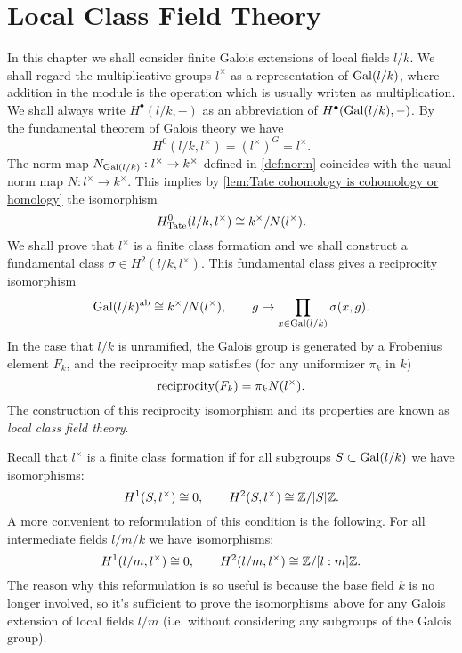 \chapter{Local Class Field Theory}

In this chapter we shall consider finite Galois extensions of local fields $l/k$.
We shall regard the multiplicative groups $l^\times$ as a representation of $\mathrm{Gal}(l/k)$, where
addition in the module is the operation which is usually written as multiplication.
We shall always write $H^\bullet(l/k,-)$ as an abbreviation of $H^\bullet(\mathrm{Gal}(l/k),-)$.
By the fundamental theorem of Galois theory we have
\[
	H^0(l/k,l^\times) = (l^\times)^G = l^\times.
\]
The norm map $N_{\mathrm{Gal}(l/k)} : l^\times \to k^\times$ defined in \ref{def:norm}
coincides with the usual norm map $N : l^\times \to k^\times$. This implies by
\ref{lem:Tate cohomology is cohomology or homology} the isomorphism
\[
	H^0_{\mathrm{Tate}}(l/k,l^\times) \cong k^\times / N(l^\times).
\]
We shall prove that $l^\times$ is a finite class formation and we shall construct a
fundamental class $\sigma \in H^2(l/k, l^\times)$.
This fundamental class gives a reciprocity isomorphism
\[
	\mathrm{Gal}(l/k)^{\mathrm{ab}}
	\cong
	k^\times / N(l^\times), \qquad
	g \mapsto \prod_{x \in \mathrm{Gal}(l/k)} \sigma(x,g).
\]
In the case that $l/k$ is unramified, the Galois group is generated by a Frobenius element $F_k$,
and the reciprocity map satisfies (for any uniformizer $\pi_k$ in $k$)
\[
	\mathrm{reciprocity}(F_k) = \pi_k N(l^\times).
\]
The construction of this reciprocity isomorphism and its properties are known as
\emph{local class field theory}.

Recall that $l^\times$ is a finite class formation if for all subgroups $S \subset \mathrm{Gal}(l/k)$
we have isomorphisms:
\[
	H^1(S,l^\times) \cong 0, \qquad H^2(S,l^\times) \cong {\mathbb Z} / |S| {\mathbb Z}.
\]
A more convenient to reformulation of this condition is the following.
For all intermediate fields $l / m / k$ we have isomorphisms:
\[
	H^1(l/m,l^\times) \cong 0, \qquad H^2(l/m,l^\times) \cong {\mathbb Z} / [l:m] {\mathbb Z}.
\]
The reason why this reformulation is so useful is because the base field $k$ is no longer involved,
so it's sufficient to prove the isomorphisms above for any Galois extension of local fields $l/m$
(i.e. without considering any subgroups of the Galois group).

